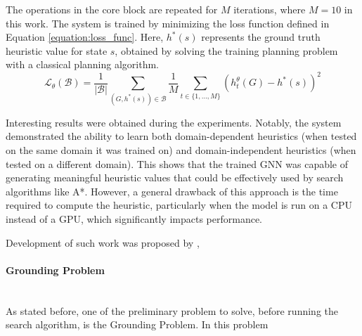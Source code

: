 The operations in the core block are repeated for $M$ iterations, where $M = 10$ in this work.
The system is trained by minimizing the loss function defined in Equation \ref{equation:loss_func}. Here, $h^{*}(s)$ represents the ground truth heuristic value for state $s$, obtained by solving the training planning problem with a classical planning algorithm.
\begin{equation}
    \mathcal{L}_\theta(\mathcal{B})=\frac{1}{|\mathcal{B}|} \sum_{\left(G, h^*(s)\right) \in \mathcal{B}} \frac{1}{M} \sum_{t \in \{1, \ldots, M\}}\left(h_t^\theta(G)-h^*(s)\right)^2
    \label{equation:loss_func}
\end{equation}

Interesting results were obtained during the experiments. Notably, the system demonstrated the ability to learn both domain-dependent heuristics (when tested on the same domain it was trained on) and domain-independent heuristics (when tested on a different domain). This shows that the trained GNN was capable of generating meaningful heuristic values that could be effectively used by search algorithms like A*. However, a general drawback of this approach is the time required to compute the heuristic, particularly when the model is run on a CPU instead of a GPU, which significantly impacts performance.

Development of such work was proposed by \cite{chen2024learning},

\paragraph*{Grounding Problem}\mbox{}\\
As stated before, one of the preliminary problem to solve, before running the search algorithm, is the Grounding Problem. In this problem 
